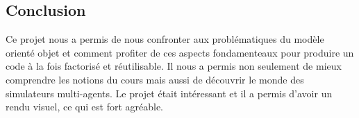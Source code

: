 \documentclass [a4paper,11pt,titlepage] {article}
\begin{document}
\begin{center}
\section* {Conclusion }
\end{center}

Ce projet nous a permis de nous confronter aux problématiques du modèle orienté objet et comment profiter de ces aspects fondamenteaux pour produire un code à la fois factorisé et réutilisable. Il nous a permis non seulement de mieux comprendre les notions du cours
mais aussi de découvrir le monde des simulateurs multi-agents. Le
projet était intéressant et il a permis d’avoir un rendu visuel, ce qui est fort agréable.
\end{document}

